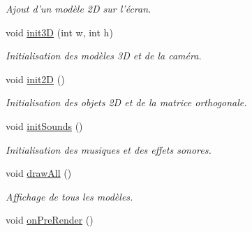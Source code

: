 \begin{DoxyCompactItemize}
\begin{DoxyCompactList}\small\item\em Ajout d'un modèle 2\-D sur l'écran. \end{DoxyCompactList}\item 
\hypertarget{classSceneManager_a85be3bf568c2050211027b9db5e0ffc2}{void \hyperlink{classSceneManager_a85be3bf568c2050211027b9db5e0ffc2}{init3\-D} (int w, int h)}\label{classSceneManager_a85be3bf568c2050211027b9db5e0ffc2}

\begin{DoxyCompactList}\small\item\em Initialisation des modèles 3\-D et de la caméra. \end{DoxyCompactList}\item 
\hypertarget{classSceneManager_af50c8abaae0774c3ded179269fb4f247}{void \hyperlink{classSceneManager_af50c8abaae0774c3ded179269fb4f247}{init2\-D} ()}\label{classSceneManager_af50c8abaae0774c3ded179269fb4f247}

\begin{DoxyCompactList}\small\item\em Initialisation des objets 2\-D et de la matrice orthogonale. \end{DoxyCompactList}\item 
\hypertarget{classSceneManager_a6c3b7f01e718505c424e97bef4bc9394}{void \hyperlink{classSceneManager_a6c3b7f01e718505c424e97bef4bc9394}{init\-Sounds} ()}\label{classSceneManager_a6c3b7f01e718505c424e97bef4bc9394}

\begin{DoxyCompactList}\small\item\em Initialisation des musiques et des effets sonores. \end{DoxyCompactList}\item 
\hypertarget{classSceneManager_ae95a2a4d00b37f18b924f30570619a30}{void \hyperlink{classSceneManager_ae95a2a4d00b37f18b924f30570619a30}{draw\-All} ()}\label{classSceneManager_ae95a2a4d00b37f18b924f30570619a30}

\begin{DoxyCompactList}\small\item\em Affichage de tous les modèles. \end{DoxyCompactList}\item 
\hypertarget{classSceneManager_a167d8c660828c07aa6b189e0a4c809bd}{void \hyperlink{classSceneManager_a167d8c660828c07aa6b189e0a4c809bd}{on\-Pre\-Render} ()}\label{classSceneManager_a167d8c660828c07aa6b189e0a4c809bd}


\end{DoxyCompactItemize}
